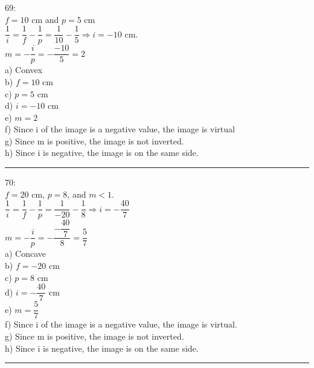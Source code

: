 \documentclass[fleqn]{article}
\begin{document}
\begin{enumerate}
    \textcolor{hwColor}{
      69: \\
      $f=10$ cm and $p=5$ cm \\
      $\dfrac{1}{i}=\dfrac{1}{f}-\dfrac{1}{p}=\dfrac{1}{10}-\dfrac{1}{5} \Longrightarrow i=-10$ cm. \\
      $m=-\dfrac{i}{p}=-\dfrac{-10}{5}=2$ \\
      a) Convex \\
      b) $f=10$ cm \\
      c) $p=5$ cm \\
      d) $i=-10$ cm \\
      e) $m=2$ \\
      f) Since i of the image is a negative value, the image is virtual \\
      g) Since m is positive, the image is not inverted. \\
      h) Since i is negative, the image is on the same side. \\
    }

    \textcolor{hwColor}{
      \rule{15cm}{0.4pt}
    }

    \textcolor{hwColor}{
      70: \\
      $f=20$ cm, $p=8$, and $m<1$. \\
      $\dfrac{1}{i}=\dfrac{1}{f}-\dfrac{1}{p}=\dfrac{1}{-20}-\dfrac{1}{8} \Longrightarrow i=-\dfrac{40}{7}$ \\
      $m=-\dfrac{i}{p}=-\dfrac{-\dfrac{40}{7}}{8}=\dfrac{5}{7}$ \\
      a) Concave \\
      b) $f=-20$ cm \\
      c) $p=8$ cm \\
      d) $i=-\dfrac{40}{7}$ cm \\
      e) $m=\dfrac{5}{7}$ \\
      f) Since i of the image is a negative value, the image is virtual. \\
      g) Since m is positive, the image is not inverted. \\
      h) Since i is negative, the image is on the same side. \\
    }

    \textcolor{hwColor}{
      \rule{15cm}{0.4pt}
    }


\end{enumerate}
\end{document}
